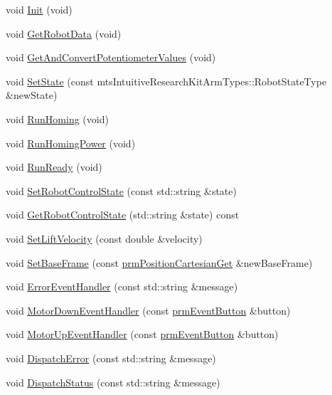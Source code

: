 \begin{DoxyCompactItemize}
\item 
void \hyperlink{classmts_intuitive_research_kit_s_u_j_a28854d3a0e85f9171aecbd6c71a3db84}{Init} (void)
\item 
void \hyperlink{classmts_intuitive_research_kit_s_u_j_ad21f3576b7317da777071190a1d14d5a}{Get\-Robot\-Data} (void)
\item 
void \hyperlink{classmts_intuitive_research_kit_s_u_j_a7c0edaae94e2f6ae0eb9954292e96a04}{Get\-And\-Convert\-Potentiometer\-Values} (void)
\item 
void \hyperlink{classmts_intuitive_research_kit_s_u_j_ac8045d25e35df425a735cb3d8d08dae7}{Set\-State} (const mts\-Intuitive\-Research\-Kit\-Arm\-Types\-::\-Robot\-State\-Type \&new\-State)
\item 
void \hyperlink{classmts_intuitive_research_kit_s_u_j_af3aa4ebbcb09e8c150a9f0fab2f1a319}{Run\-Homing} (void)
\item 
void \hyperlink{classmts_intuitive_research_kit_s_u_j_a131f33f5e5b6100de115c318d05ae598}{Run\-Homing\-Power} (void)
\item 
void \hyperlink{classmts_intuitive_research_kit_s_u_j_a131482e0f6383d5752f9b2300e64f282}{Run\-Ready} (void)
\item 
void \hyperlink{classmts_intuitive_research_kit_s_u_j_a81f15d4071f80ed9eab3712f9a957934}{Set\-Robot\-Control\-State} (const std\-::string \&state)
\item 
void \hyperlink{classmts_intuitive_research_kit_s_u_j_aea49904777eacf24c1c52215ad757cf6}{Get\-Robot\-Control\-State} (std\-::string \&state) const 
\item 
void \hyperlink{classmts_intuitive_research_kit_s_u_j_ae85ef3d4f7685492e25a665f0f8b873d}{Set\-Lift\-Velocity} (const double \&velocity)
\item 
void \hyperlink{classmts_intuitive_research_kit_s_u_j_a1d653fd48864f67a8133e1368feb0625}{Set\-Base\-Frame} (const \hyperlink{classprm_position_cartesian_get}{prm\-Position\-Cartesian\-Get} \&new\-Base\-Frame)
\item 
void \hyperlink{classmts_intuitive_research_kit_s_u_j_a36af5b0faebfffa611bced96dc6fee9e}{Error\-Event\-Handler} (const std\-::string \&message)
\item 
void \hyperlink{classmts_intuitive_research_kit_s_u_j_a9b0effa9a1671d84dd7592ea12bf42a0}{Motor\-Down\-Event\-Handler} (const \hyperlink{classprm_event_button}{prm\-Event\-Button} \&button)
\item 
void \hyperlink{classmts_intuitive_research_kit_s_u_j_a4ffc9f8537a4c2cca413d82f8fd8cfb9}{Motor\-Up\-Event\-Handler} (const \hyperlink{classprm_event_button}{prm\-Event\-Button} \&button)
\item 
void \hyperlink{classmts_intuitive_research_kit_s_u_j_a17e207fda7ff8900f54f539542897563}{Dispatch\-Error} (const std\-::string \&message)
\item 
void \hyperlink{classmts_intuitive_research_kit_s_u_j_a49551c2b529e585c395602fdc324a44b}{Dispatch\-Status} (const std\-::string \&message)
\end{DoxyCompactItemize}
